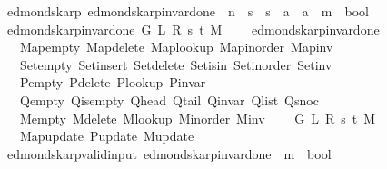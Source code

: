 \begin{isabellebody}
\ {\isacharparenleft}{\kern0pt}\ edmonds{\isacharunderscore}{\kern0pt}karp{\isacharparenright}{\kern0pt}\ edmonds{\isacharunderscore}{\kern0pt}karp{\isacharunderscore}{\kern0pt}invar{\isacharunderscore}{\kern0pt}done{\isacharunderscore}{\kern0pt}{}{\isacharprime}{\kern0pt}\ {\isacharcolon}{\kern0pt}{\isacharcolon}{\kern0pt}\ {\isachardoublequoteopen}{\isacharprime}{\kern0pt}n\ {\isasymRightarrow}\ {\isacharprime}{\kern0pt}s\ {\isasymRightarrow}\ {\isacharprime}{\kern0pt}s\ {\isasymRightarrow}\ {\isacharprime}{\kern0pt}a\ {\isasymRightarrow}\ {\isacharprime}{\kern0pt}a\ {\isasymRightarrow}\ {\isacharprime}{\kern0pt}m\ {\isasymRightarrow}\ bool{\isachardoublequoteclose}\ \isanewline
\ \ {\isachardoublequoteopen}edmonds{\isacharunderscore}{\kern0pt}karp{\isacharunderscore}{\kern0pt}invar{\isacharunderscore}{\kern0pt}done{\isacharunderscore}{\kern0pt}{}{\isacharprime}{\kern0pt}\ G\ L\ R\ s\ t\ M\ {\isasymequiv}\isanewline
\ \ \ edmonds{\isacharunderscore}{\kern0pt}karp{\isacharunderscore}{\kern0pt}invar{\isacharunderscore}{\kern0pt}done{\isacharunderscore}{\kern0pt}{}\isanewline
\ \ \ \ Map{\isacharunderscore}{\kern0pt}empty\ Map{\isacharunderscore}{\kern0pt}delete\ Map{\isacharunderscore}{\kern0pt}lookup\ Map{\isacharunderscore}{\kern0pt}inorder\ Map{\isacharunderscore}{\kern0pt}inv\isanewline
\ \ \ \ Set{\isacharunderscore}{\kern0pt}empty\ Set{\isacharunderscore}{\kern0pt}insert\ Set{\isacharunderscore}{\kern0pt}delete\ Set{\isacharunderscore}{\kern0pt}isin\ Set{\isacharunderscore}{\kern0pt}inorder\ Set{\isacharunderscore}{\kern0pt}inv\isanewline
\ \ \ \ P{\isacharunderscore}{\kern0pt}empty\ P{\isacharunderscore}{\kern0pt}delete\ P{\isacharunderscore}{\kern0pt}lookup\ P{\isacharunderscore}{\kern0pt}invar\isanewline
\ \ \ \ Q{\isacharunderscore}{\kern0pt}empty\ Q{\isacharunderscore}{\kern0pt}is{\isacharunderscore}{\kern0pt}empty\ Q{\isacharunderscore}{\kern0pt}head\ Q{\isacharunderscore}{\kern0pt}tail\ Q{\isacharunderscore}{\kern0pt}invar\ Q{\isacharunderscore}{\kern0pt}list\ Q{\isacharunderscore}{\kern0pt}snoc\isanewline
\ \ \ \ M{\isacharunderscore}{\kern0pt}empty\ M{\isacharunderscore}{\kern0pt}delete\ M{\isacharunderscore}{\kern0pt}lookup\ M{\isacharunderscore}{\kern0pt}inorder\ M{\isacharunderscore}{\kern0pt}inv\isanewline
\ \ \ \ G\ L\ R\ s\ t\ M\isanewline
\ \ \ \ Map{\isacharunderscore}{\kern0pt}update\ P{\isacharunderscore}{\kern0pt}update\ M{\isacharunderscore}{\kern0pt}update{\isachardoublequoteclose}\isanewline
\isanewline
{}\isamarkupfalse%
\ {\isacharparenleft}{\kern0pt}\ edmonds{\isacharunderscore}{\kern0pt}karp{\isacharunderscore}{\kern0pt}valid{\isacharunderscore}{\kern0pt}input{\isacharparenright}{\kern0pt}\ edmonds{\isacharunderscore}{\kern0pt}karp{\isacharunderscore}{\kern0pt}invar{\isacharunderscore}{\kern0pt}done{\isacharunderscore}{\kern0pt}{}{\isacharprime}{\kern0pt}{\isacharprime}{\kern0pt}\ {\isacharcolon}{\kern0pt}{\isacharcolon}{\kern0pt}\ {\isachardoublequoteopen}{\isacharprime}{\kern0pt}m\ {\isasymRightarrow}\ bool{\isachardoublequoteclose}\ \isanewline

\end{isabellebody}
